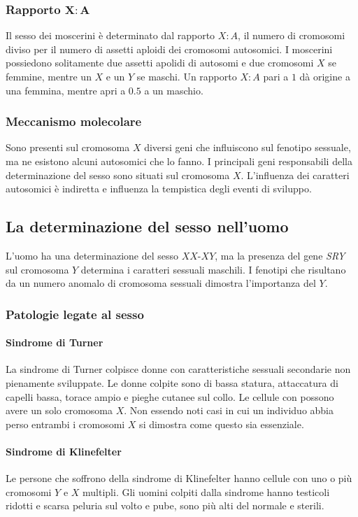 		\subsubsection{Rapporto $\mathbf{X:A}$}
		Il sesso dei moscerini \`e determinato dal rapporto $X:A$, il numero di cromosomi diviso per il numero di assetti aploidi dei cromosomi autosomici.
		I moscerini possiedono solitamente due assetti apolidi di autosomi e due cromosomi $X$ se femmine, mentre un $X$ e un $Y$ se maschi.
		Un rapporto $X:A$ pari a $1$ d\`a origine a una femmina, mentre apri a $0.5$ a un maschio.
	
		\subsubsection{Meccanismo molecolare}
		Sono presenti sul cromosoma $X$ diversi geni che influiscono sul fenotipo sessuale, ma ne esistono alcuni autosomici che lo fanno.
		I principali geni responsabili della determinazione del sesso sono situati sul cromosoma $X$.
		L'influenza dei caratteri autosomici \`e indiretta e influenza la tempistica degli eventi di sviluppo.

	\subsection{La determinazione del sesso nell'uomo}
	L'uomo ha una determinazione del sesso $XX$-$XY$, ma la presenza del gene \emph{SRY} sul cromosoma $Y$ determina i caratteri sessuali maschili.
	I fenotipi che risultano da un numero anomalo di cromosoma sessuali dimostra l'importanza del $Y$.
	
		\subsubsection{Patologie legate al sesso}
	
			\paragraph{Sindrome di Turner}
			La sindrome di Turner colpisce donne con caratteristiche sessuali secondarie non pienamente sviluppate.
			Le donne colpite sono di bassa statura, attaccatura di capelli bassa, torace ampio e pieghe cutanee sul collo.
			Le cellule con possono avere un solo cromosoma $X$.
			Non essendo noti casi in cui un individuo abbia perso entrambi i cromosomi $X$ si dimostra come questo sia essenziale.

			\paragraph{Sindrome di Klinefelter}
			Le persone che soffrono della sindrome di Klinefelter hanno cellule con uno o pi\`u cromosomi $Y$ e $X$ multipli.
			Gli uomini colpiti dalla sindrome hanno testicoli ridotti e scarsa peluria sul volto e pube, sono pi\`u alti del normale e sterili.
	
